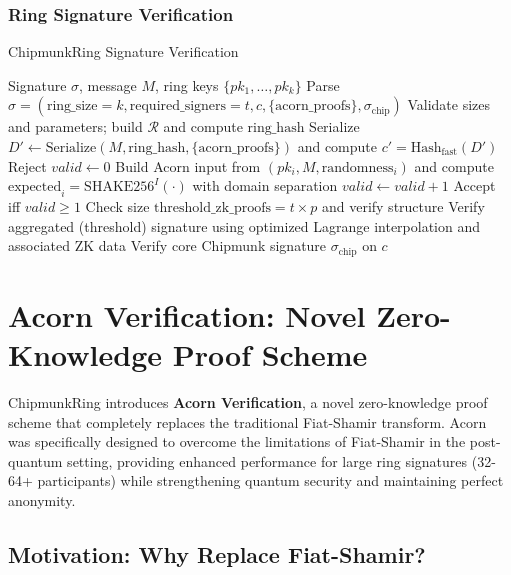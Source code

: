 \documentclass[11pt,a4paper]{article}
\begin{document}
\subsubsection{Ring Signature Verification}
\begin{algorithm}
\caption{ChipmunkRing Signature Verification}
\begin{algorithmic}[1]
\REQUIRE Signature $\sigma$, message $M$, ring keys $\{pk_1, \ldots, pk_k\}$
\STATE Parse $\sigma = (\text{ring\_size}=k, \text{required\_signers}=t, c, \{\text{acorn\_proofs}\}, \sigma_{\text{chip}})$
\STATE Validate sizes and parameters; build $\mathcal{R}$ and compute $\text{ring\_hash}$
\STATE Serialize $D' \leftarrow \text{Serialize}(M, \text{ring\_hash}, \{\text{acorn\_proofs}\})$ and compute $c' = \text{Hash}_{\text{fast}}(D')$
 \RETURN Reject \ENDIF
{} 
    \STATE $valid \leftarrow 0$
        \STATE Build Acorn input from $(pk_i, M, \text{randomness}_i)$ and compute $\text{expected}_i = \text{SHAKE256}^{I}(\cdot)$ with domain separation
         $valid \leftarrow valid + 1$ \ENDIF
    \ENDFOR
    \STATE Accept iff $valid \ge 1$
\ELSE {}
    \STATE Check size $\text{threshold\_zk\_proofs} = t \times p$ and verify structure
    \STATE Verify aggregated (threshold) signature using optimized Lagrange interpolation and associated ZK data
\ENDIF
\STATE Verify core Chipmunk signature $\sigma_{\text{chip}}$ on $c$
\end{algorithmic}
\end{algorithm}

\section{Acorn Verification: Novel Zero-Knowledge Proof Scheme}

ChipmunkRing introduces \textbf{Acorn Verification}, a novel zero-knowledge proof scheme that completely replaces the traditional Fiat-Shamir transform. Acorn was specifically designed to overcome the limitations of Fiat-Shamir in the post-quantum setting, providing enhanced performance for large ring signatures (32-64+ participants) while strengthening quantum security and maintaining perfect anonymity.

\subsection{Motivation: Why Replace Fiat-Shamir?}
\end{document}
